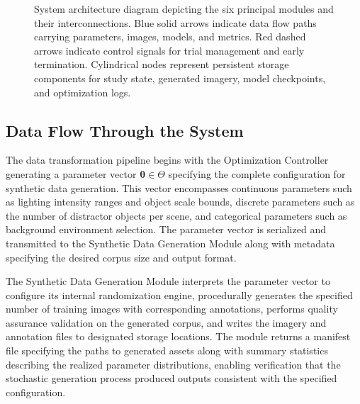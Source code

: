 \begin{figure}[htbp]
\caption{System architecture diagram depicting the six principal modules and their interconnections. Blue solid arrows indicate data flow paths carrying parameters, images, models, and metrics. Red dashed arrows indicate control signals for trial management and early termination. Cylindrical nodes represent persistent storage components for study state, generated imagery, model checkpoints, and optimization logs.}
\label{fig:system_architecture}
\end{figure}

\subsection{Data Flow Through the System}

The data transformation pipeline begins with the Optimization Controller generating a parameter vector $\boldsymbol{\theta} \in \Theta$ specifying the complete configuration for synthetic data generation. This vector encompasses continuous parameters such as lighting intensity ranges and object scale bounds, discrete parameters such as the number of distractor objects per scene, and categorical parameters such as background environment selection. The parameter vector is serialized and transmitted to the Synthetic Data Generation Module along with metadata specifying the desired corpus size and output format.

The Synthetic Data Generation Module interprets the parameter vector to configure its internal randomization engine, procedurally generates the specified number of training images with corresponding annotations, performs quality assurance validation on the generated corpus, and writes the imagery and annotation files to designated storage locations. The module returns a manifest file specifying the paths to generated assets along with summary statistics describing the realized parameter distributions, enabling verification that the stochastic generation process produced outputs consistent with the specified configuration.


